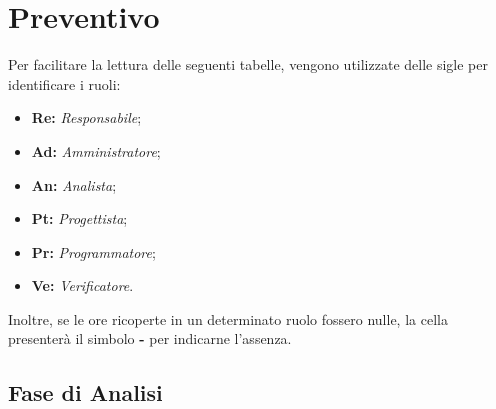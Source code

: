 \section{Preventivo}
Per facilitare la lettura delle seguenti tabelle, vengono utilizzate delle sigle 
per identificare i ruoli:
\begin{itemize}
\item \textbf{Re:} \textit{Responsabile};
\item \textbf{Ad:} \textit{Amministratore};
\item \textbf{An:} \textit{Analista};
\item \textbf{Pt:} \textit{Progettista};
\item \textbf{Pr:} \textit{Programmatore};
\item \textbf{Ve:} \textit{Verificatore}.
\end{itemize}
\noindent
Inoltre, se le ore ricoperte in un determinato ruolo fossero nulle, la cella 
presenterà il simbolo \textbf{-} per indicarne l'assenza. 

\subsection{Fase di Analisi}
